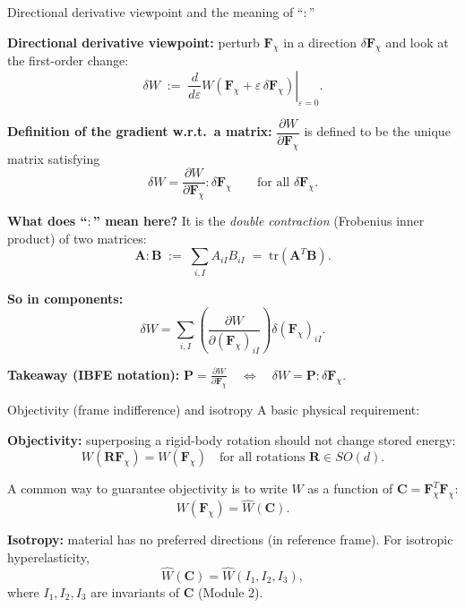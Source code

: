 \documentclass[aspectratio=169]{beamer}
\newcommand{\Cten}{\bm{C}}     %
\newcommand{\Fdef}{\bm{F}_{\chi}}  %
\begin{document}
\begin{frame}{Directional derivative viewpoint and the meaning of ``$: $''}
\footnotesize

\textbf{Directional derivative viewpoint:} perturb \(\bm{F}_{\chi}\) in a direction \(\delta\bm{F}_{\chi}\) and look at the first-order change:
\[
\delta W
\;:=\;
\left.\frac{d}{d\varepsilon}W\!\left(\bm{F}_{\chi}+\varepsilon\,\delta\bm{F}_{\chi}\right)\right|_{\varepsilon=0}.
\]

\medskip
\textbf{Definition of the gradient w.r.t.\ a matrix:} \(\dfrac{\partial W}{\partial \bm{F}_{\chi}}\) is defined to be the unique matrix satisfying
\[
\delta W
=
\frac{\partial W}{\partial \bm{F}_{\chi}} : \delta\bm{F}_{\chi}
\qquad \text{for all } \delta\bm{F}_{\chi}.
\]

\medskip
\textbf{What does ``$: $'' mean here?} It is the \emph{double contraction} (Frobenius inner product) of two matrices:
\[
\bm{A}:\bm{B}
\;:=\;
\sum_{i,I} A_{iI}B_{iI}
\;=\;
\mathrm{tr}(\bm{A}^{T}\bm{B}).
\]

\medskip
\textbf{So in components:}
\[
\delta W
=
\sum_{i,I}\left(\frac{\partial W}{\partial (\bm{F}_{\chi})_{iI}}\right)\delta(\bm{F}_{\chi})_{iI}.
\]

\medskip
\textbf{Takeaway (IBFE notation):} $\bm{P}=\frac{\partial W}{\partial \bm{F}_{\chi}}
\quad\Longleftrightarrow\quad
\delta W = \bm{P}:\delta\bm{F}_{\chi}.$
\end{frame}


\begin{frame}{Objectivity (frame indifference) and isotropy}
\small
A basic physical requirement:

\medskip
\textbf{Objectivity:} superposing a rigid-body rotation should not change stored energy:
\[
W(\bm{R}\Fdef)=W(\Fdef)\quad \text{for all rotations }\bm{R}\in SO(d).
\]

\medskip
A common way to guarantee objectivity is to write \(W\) as a function of \(\Cten=\Fdef^T\Fdef\):
\[
W(\Fdef)=\widehat{W}(\Cten).
\]

\medskip
\textbf{Isotropy:} material has no preferred directions (in reference frame). For isotropic hyperelasticity,
\[
\widehat{W}(\Cten)=\widehat{W}(I_1,I_2,I_3),
\]
where \(I_1,I_2,I_3\) are invariants of \(\Cten\) (Module 2).

\end{frame}
\end{document}
